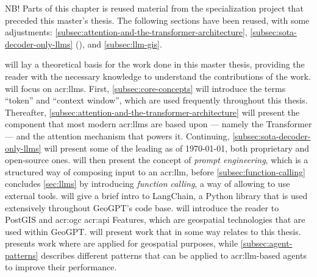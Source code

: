 \begin{itshape}
    NB! Parts of this chapter is reused material from the specialization project \citep{holmLLMsDeathGIS2023} that preceded this master's thesis. The following sections have been reused, with some adjustments: \autoref{subsec:attention-and-the-transformer-architecture}, \autoref{subsec:sota-decoder-only-llms} (), and \autoref{subsec:llm-gis}.
\end{itshape}

\vspace{12pt}

\noindent {} will lay a theoretical basis for the work done in this master thesis, providing the reader with the necessary knowledge to understand the contributions of the work.  will focus on \glspl{acr:llm}. First, \autoref{subsec:core-concepts} will introduce the terms \enquote{token} and \enquote{context window}, which are used frequently throughout this thesis. Thereafter, \autoref{subsec:attention-and-the-transformer-architecture} will present the component that most modern \glspl{acr:llm} are based upon --- namely the Transformer --- and the attention mechanism that powers it. Continuing, \autoref{subsec:sota-decoder-only-llms} will present some of the leading  as of \today, both proprietary and open-source ones.  will then present the concept of \textit{prompt engineering}, which is a structured way of composing input to an \acrshort{acr:llm}, before \autoref{subsec:function-calling} concludes \autoref{sec:llms} by introducing \textit{function calling}, a way of allowing  to use external tools.  will give a brief intro to LangChain, a Python library that is used extensively throughout GeoGPT's code base.  will introduce the reader to PostGIS and \acrshort{acr:ogc} \acrshort{acr:api} Features, which are geospatial technologies that are used within GeoGPT.  will present work that in some way relates to this thesis.  presents work where  are applied for geospatial purposes, while \autoref{subsec:agent-patterns} describes different patterns that can be applied to \acrshort{acr:llm}-based agents to improve their performance.


\section[Large Language Models]{}
\label{sec:llms}

